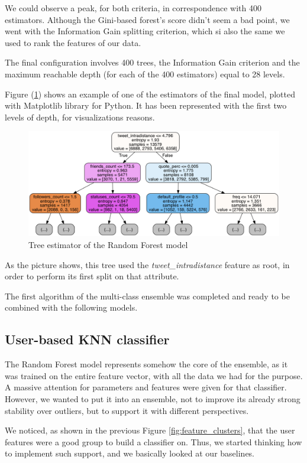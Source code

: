 We could observe a peak, for both criteria, in correspondence with 400 estimators.
Although the Gini-based forest's score didn't seem a bad point, we went with the Information Gain splitting criterion, which si also the same we used to rank the features of our data.

The final configuration involves 400 trees, the Information Gain criterion and the maximum reachable depth (for each of the 400 estimators) equal to 28 levels.

Figure (\ref{fig:tree}) shows an example of one of the estimators of the final model, plotted with Matplotlib library for Python. It has been represented with the first two levels of depth, for visualizations reasons.

\begin{figure}[htp!]
	\centering
	\includegraphics[width=\columnwidth]{chapter5/figure/tree.png}
	\caption{Tree estimator of the Random Forest model}
	\label{fig:tree}
\end{figure}

As the picture shows, this tree used the \textit{tweet\_intradistance} feature as root, in order to perform its first split on that attribute.

The first algorithm of the multi-class ensemble was completed and ready to be combined with the following models.

\subsection{User-based KNN classifier}
The Random Forest model represents somehow the core of the ensemble, as it was trained on the entire feature vector, with all the data we had for the purpose. A massive attention for parameters and features were given for that classifier. 
However, we wanted to put it into an ensemble, not to improve its already strong stability over outliers, but to support it with different perspectives.

We noticed, as shown in the previous Figure \ref{fig:feature_clusters}, that the user features were a good group to build a classifier on. Thus, we started thinking how to implement such support, and we basically looked at our baselines.

